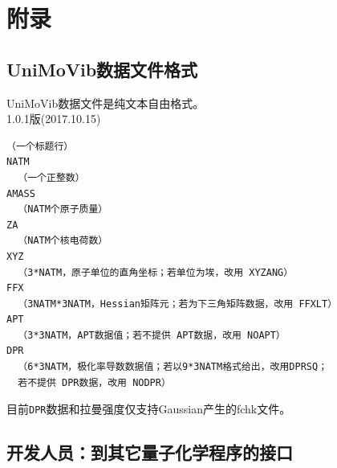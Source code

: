 \documentclass[12pt,a4paper,openany,twoside,cap]{ctexbook}
\begin{document}
\appendix
\chapter{附录} \label{part:appdx}

\section{UniMoVib数据文件格式} \label{sec:almfmt}

UniMoVib数据文件是纯文本自由格式。 \\
1.0.1版(2017.10.15)
\begin{colorboxed}[oval=false,boxcolor=green!75!black,bgcolor=green!5!white]
\ttfamily
\begin{lstlisting}
（一个标题行）
NATM
  （一个正整数）
AMASS
  （NATM个原子质量）
ZA
  （NATM个核电荷数）
XYZ
  （3*NATM，原子单位的直角坐标；若单位为埃，改用 XYZANG）
FFX
  （3NATM*3NATM，Hessian矩阵元；若为下三角矩阵数据，改用 FFXLT）
APT
  （3*3NATM，APT数据值；若不提供 APT数据，改用 NOAPT）
DPR
  （6*3NATM，极化率导数数据值；若以9*3NATM格式给出，改用DPRSQ；
  若不提供 DPR数据，改用 NODPR）
\end{lstlisting}\end{colorboxed}
目前\verb|DPR|数据和拉曼强度仅支持Gaussian产生的fchk文件。

\section{开发人员：到其它量子化学程序的接口} \label{sec:interface}
\end{document}
